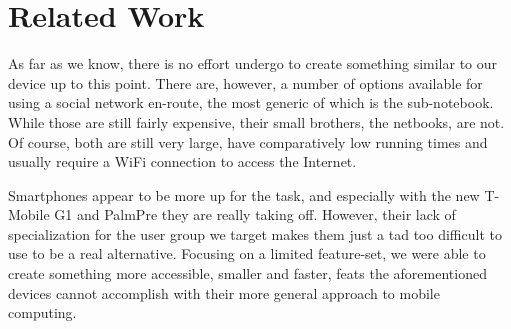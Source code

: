 %
%
%
\section{Related Work}
As far as we know, there is no effort undergo to create something similar to our device up to this point. There are,
however, a number of options available for using a social network en-route, the most generic of which is the 
sub-notebook. While those are still fairly expensive, their small brothers, the netbooks, are not. Of course,
both are still very large, have comparatively low running times and usually require a WiFi connection to 
access the Internet. 

Smartphones appear to be more up for the task, and especially with the new T-Mobile G1 and 
Palm\registered Pre they are really taking off. However, their lack of specialization for the user 
group we target makes them just a tad too difficult to use to be a real alternative. 
Focusing on a limited feature-set, we were able to create something more accessible, smaller and 
faster, feats the aforementioned devices cannot accomplish with their more general approach to 
mobile computing.

